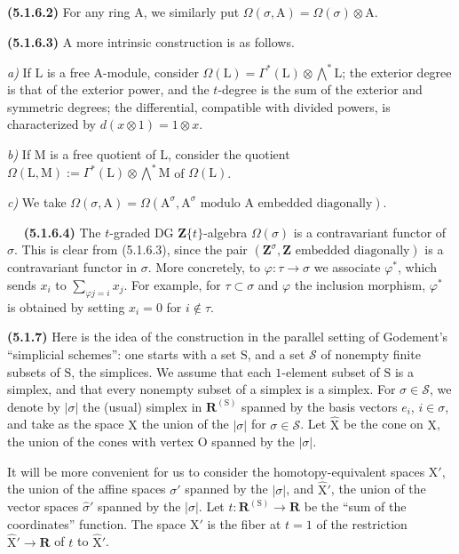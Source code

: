\documentclass[11pt,leqno]{article}
\newcommand{\Page}[1]{\ifvmode\noindent\else\unskip\ \fi{\footnotesize\textcolor{gray}{[p.\,#1]}}\ \ignorespaces}
\begin{document}
\textbf{(5.1.6.2)} For any ring \(\mathrm{A}\), we similarly put \(\Omega(\sigma,\mathrm{A})=\Omega(\sigma)\otimes\mathrm{A}\).

\textbf{(5.1.6.3)} A more intrinsic construction is as follows.

\textit{a)} If \(\mathrm{L}\) is a free \(\mathrm{A}\)-module, consider \(\Omega(\mathrm{L})=\Gamma^*(\mathrm{L})\otimes\bigwedge\limits^{*}\mathrm{L}\); the exterior degree is that of the exterior power, and the \(t\)-degree is the sum of the exterior and symmetric degrees; the differential, compatible with divided powers, is characterized by \(d(x\otimes1)=1\otimes x\).

\textit{b)} If \(\mathrm{M}\) is a free quotient of \(\mathrm{L}\), consider the quotient \(\Omega(\mathrm{L},\mathrm{M}):=\Gamma^*(\mathrm{L})\otimes\bigwedge\limits^{*}\mathrm{M}\) of \(\Omega(\mathrm{L})\).

\textit{c)} We take \(\Omega(\sigma,\mathrm{A})=\Omega(\mathrm{A}^{\sigma},\mathrm{A}^{\sigma}\text{ modulo }\mathrm{A}\text{ embedded diagonally})\).

\Page{236}
\textbf{(5.1.6.4)} The \(t\)-graded DG \(\mathbf{Z}\{t\}\)-algebra \(\Omega(\sigma)\) is a contravariant functor of \(\sigma\). This is clear from (5.1.6.3), since the pair \((\mathbf{Z}^{\sigma},\mathbf{Z}\text{ embedded diagonally})\) is a contravariant functor in \(\sigma\). More concretely, to \(\varphi:\tau\to\sigma\) we associate \(\varphi^*\), which sends \(x_i\) to \(\sum\limits_{\varphi j=i}x_j\). For example, for \(\tau\subset\sigma\) and \(\varphi\) the inclusion morphism, \(\varphi^*\) is obtained by setting \(x_i=0\) for \(i\notin\tau\).

\textbf{(5.1.7)} Here is the idea of the construction in the parallel setting of Godement's “simplicial schemes”: one starts with a set \(\mathrm{S}\), and a set \(\mathcal{S}\) of nonempty finite subsets of \(\mathrm{S}\), the simplices. We assume that each \(1\)-element subset of \(\mathrm{S}\) is a simplex, and that every nonempty subset of a simplex is a simplex. For \(\sigma\in\mathcal{S}\), we denote by \(|\sigma|\) the (usual) simplex in \(\mathbf{R}^{(\mathrm{S})}\) spanned by the basis vectors \(e_i\), \(i\in\sigma\), and take as the space \(\mathrm{X}\) the union of the \(|\sigma|\) for \(\sigma\in\mathcal{S}\). Let \(\widehat{\mathrm{X}}\) be the cone on \(\mathrm{X}\), the union of the cones with vertex \(\mathrm{O}\) spanned by the \(|\sigma|\).

It will be more convenient for us to consider the homotopy-equivalent spaces \(\mathrm{X}'\), the union of the affine spaces \(\sigma'\) spanned by the \(|\sigma|\), and \(\widehat{\mathrm{X}}'\), the union of the vector spaces \(\hat{\sigma}'\) spanned by the \(|\sigma|\). Let \(t:\mathbf{R}^{(\mathrm{S})}\to\mathbf{R}\) be the “sum of the coordinates” function. The space \(\mathrm{X}'\) is the fiber at \(t=1\) of the restriction \(\widehat{\mathrm{X}}'\to\mathbf{R}\) of \(t\) to \(\widehat{\mathrm{X}}'\).
\end{document}
